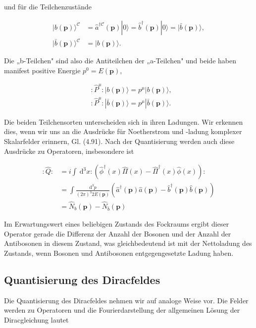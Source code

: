 \documentclass[10pt, letterpaper]{article}
\begin{document}
und für die Teilchenzustände

$$
\begin{aligned}
|b(\mathbf{p})\rangle^{\mathcal{C}} & =\hat{a}^{\dagger \mathcal{C}}(\mathbf{p})|0\rangle=\hat{b}^{\dagger}(\mathbf{p})|0\rangle=|\bar{b}(\mathbf{p})\rangle, \\
|\bar{b}(\mathbf{p})\rangle^{\mathcal{C}} & =|b(\mathbf{p})\rangle .
\end{aligned}
$$

Die „b-Teilchen" sind also die Antiteilchen der „a-Teilchen" und beide haben manifest positive Energie $p^{0}=E(\mathbf{p})$,

$$
\begin{aligned}
& : \hat{P}^{\mu}:|b(\mathbf{p})\rangle=p^{\mu}|b(\mathbf{p})\rangle, \\
& : \hat{P}^{\mu}:|\bar{b}(\mathbf{p})\rangle=p^{\mu}|\bar{b}(\mathbf{p})\rangle .
\end{aligned}
$$

Die beiden Teilchensorten unterscheiden sich in ihren Ladungen. Wir erkennen dies, wenn wir uns an die Ausdrücke für Noetherstrom und -ladung komplexer Skalarfelder erinnern, Gl. (4.91). Nach der Quantisierung werden auch diese Ausdrücke zu Operatoren, insbesondere ist

$$
\begin{aligned}
: \hat{Q}: & =i \int \mathrm{~d}^{3} x:\left(\hat{\phi}^{\dagger}(x) \hat{\Pi}(x)-\hat{\Pi}^{\dagger}(x) \hat{\phi}(x)\right): \\
& =\int \frac{\mathrm{d}^{3} p}{(2 \pi)^{3} 2 E(\mathbf{p})}\left(\hat{a}^{\dagger}(\mathbf{p}) \hat{a}(\mathbf{p})-\hat{b}^{\dagger}(\mathbf{p}) \hat{b}(\mathbf{p})\right) \\
& =\hat{N}_{b}(\mathbf{p})-\hat{N}_{\bar{b}}(\mathbf{p})
\end{aligned}
$$

Im Erwartungswert eines beliebigen Zustands des Fockraums ergibt dieser Operator gerade die Differenz der Anzahl der Bosonen und der Anzahl der Antibosonen in diesem Zustand, was gleichbedeutend ist mit der Nettoladung des Zustands, wenn Bosonen und Antibosonen entgegengesetzte Ladung haben.

\subsection*{Quantisierung des Diracfeldes}
Die Quantisierung des Diracfeldes nehmen wir auf analoge Weise vor. Die Felder werden zu Operatoren und die Fourierdarstellung der allgemeinen Lösung der Diracgleichung lautet
\end{document}
